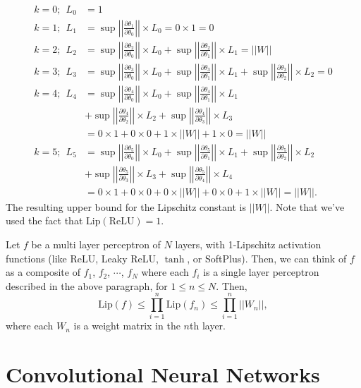 \documentclass[12pt]{report}
\numberwithin{figure}{chapter}
\theoremstyle{plain}
\theoremstyle{definition}
\theoremstyle{corollary}
\theoremstyle{definition}
\theoremstyle{plain}
\theoremstyle{definition}
\theoremstyle{plain}
\newcommand\bx{\ensuremath{\boldsymbol x}}
\newcommand\lip{\ensuremath{\text{Lip}}}
\newcommand\norm[1]{\ensuremath{\left|\left|#1\right|\right|}}
\begin{document}
\begin{align*}
k=0;\:\: L_0&=1\\
k=1;\:\: L_1&=\sup\norm{\frac{\partial\theta_1}{\partial\theta_0}}\times L_0=0\times1=0\\
k=2;\:\: L_2&
=\sup\norm{\frac{\partial\theta_2}{\partial\theta_0}}\times L_0
+\sup\norm{\frac{\partial\theta_2}{\partial\theta_1}}\times L_1=%
||W||\\
k=3;\:\: L_3&
=\sup\norm{\frac{\partial\theta_3}{\partial\theta_0}}\times L_0
+\sup\norm{\frac{\partial\theta_3}{\partial\theta_1}}\times L_1
+\sup\norm{\frac{\partial\theta_3}{\partial\theta_2}}\times L_2=0\\
k=4;\:\: L_4&
=\sup\norm{\frac{\partial\theta_4}{\partial\theta_0}}\times L_0
+\sup\norm{\frac{\partial\theta_4}{\partial\theta_1}}\times L_1\\
&+\sup\norm{\frac{\partial\theta_4}{\partial\theta_2}}\times L_2
+\sup\norm{\frac{\partial\theta_4}{\partial\theta_3}}\times L_3\\
&=0\times1+0\times0+1\times||W||+1\times0=||W||\\
k=5;\:\: L_5&
=\sup\norm{\frac{\partial\theta_5}{\partial\theta_0}}\times L_0
+\sup\norm{\frac{\partial\theta_5}{\partial\theta_1}}\times L_1
+\sup\norm{\frac{\partial\theta_5}{\partial\theta_2}}\times L_2\\
&+\sup\norm{\frac{\partial\theta_5}{\partial\theta_3}}\times L_3
+\sup\norm{\frac{\partial\theta_5}{\partial\theta_4}}\times L_4\\
&=0\times1+0\times0+0\times||W||+0\times0+1\times||W||=||W||.
\end{align*}
The resulting upper bound for the Lipschitz constant is \(||W||\).
Note that we've used the fact that \(\lip(\text{ReLU})=1\).

Let \(f\) be a multi layer perceptron of \(N\) layers, with 1-Lipschitz activation functions (like ReLU, Leaky ReLU, \(\tanh\), or SoftPlus).
Then, we can think of \(f\) as a composite of \(f_1\), \(f_2\), \(\cdots\), \(f_N\) where each \(f_i\) is a single layer perceptron described in the above paragraph, for \(1\le n\le N\).
Then,
\[\lip(f)\le\prod_{i=1}^n\lip(f_n)\le\prod_{i=1}^n||W_n||,\]
where each \(W_n\) is a weight matrix in the \(n\)th layer.

\section{Convolutional Neural Networks}
\end{document}
